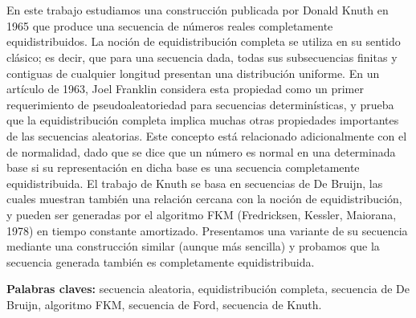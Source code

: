 \chapter*{\runtitulo}

\noindent En este trabajo estudiamos una construcción publicada por Donald Knuth en 1965 que produce una secuencia de números reales completamente equidistribuidos. La noción de equidistribución completa se utiliza en su sentido clásico; es decir, que para una secuencia dada, todas sus subsecuencias finitas y contiguas de cualquier longitud presentan una distribución uniforme. En un artículo de 1963, Joel Franklin considera esta propiedad como un primer requerimiento de pseudoaleatoriedad para secuencias determinísticas, y prueba que la equidistribución completa implica muchas otras propiedades importantes de las secuencias aleatorias. Este concepto está relacionado adicionalmente con el de normalidad, dado que se dice que un número es normal en una determinada base si su representación en dicha base es una secuencia completamente equidistribuida. El trabajo de Knuth se basa en secuencias de De Bruijn, las cuales muestran también una relación cercana con la noción de equidistribución, y pueden ser generadas por el algoritmo FKM (Fredricksen, Kessler, Maiorana, 1978) en tiempo constante amortizado. Presentamos una variante de su secuencia mediante una construcción similar (aunque más sencilla) y probamos que la secuencia generada también es completamente equidistribuida.

\bigskip

\noindent\textbf{Palabras claves:} secuencia aleatoria, equidistribución completa, secuencia de De Bruijn, algoritmo FKM, secuencia de Ford, secuencia de Knuth.